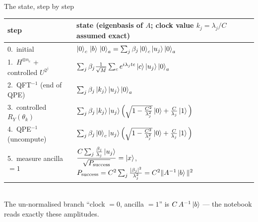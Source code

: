 \documentclass[aspectratio=169,11pt]{beamer}
\begin{document}
\begin{frame}{The state, step by step}
  \footnotesize
  \begin{tabular}{p{3.1cm}p{9.9cm}}
    \toprule step & state (eigenbasis of $A$; clock value $k_j = \lambda_j/C$ assumed exact)\\ \midrule
    0.\ initial & $\ket0_c\,\ket b\,\ket0_a = \sum_j\beta_j\ket0_c\ket{u_j}\ket0_a$\\[1mm]
    1.\ $H^{\otimes n_c}$ + controlled $U^{2^j}$ & $\sum_j\beta_j\frac{1}{\sqrt M}\sum_ce^{i\lambda_jtc}\ket c\ket{u_j}\ket0_a$\\[1mm]
    2.\ QFT$^{-1}$ (end of QPE) & $\sum_j\beta_j\ket{k_j}\ket{u_j}\ket0_a$\\[1mm]
    3.\ controlled $R_Y(\theta_k)$ & $\sum_j\beta_j\ket{k_j}\ket{u_j}\Big(\sqrt{1 - \frac{C^2}{\lambda_j^2}}\ket0 + \frac{C}{\lambda_j}\ket1\Big)$\\[1mm]
    4.\ QPE$^{-1}$ (uncompute) & $\sum_j\beta_j\ket0_c\ket{u_j}\Big(\sqrt{1 - \frac{C^2}{\lambda_j^2}}\ket0 + \frac{C}{\lambda_j}\ket1\Big)$\\[1mm]
    5.\ measure ancilla $= 1$ & $\dfrac{C\sum_j\frac{\beta_j}{\lambda_j}\ket{u_j}}{\sqrt{P_{\text{success}}}} = \ket x$,\qquad $P_{\text{success}} = C^2\sum_j\frac{|\beta_j|^2}{\lambda_j^2} = C^2\|A^{-1}\ket b\|^2$\\ \bottomrule
  \end{tabular}\\[2mm]
  The un-normalised branch ``clock $= 0$, ancilla $= 1$'' is $C\,A^{-1}\ket b$ --- the notebook reads exactly these amplitudes.
\end{frame}
\end{document}
